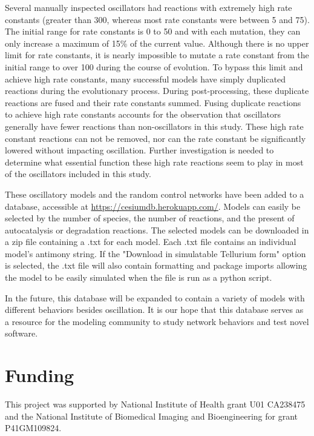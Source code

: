\documentclass[12pt]{report}
\begin{document}
Several manually inspected oscillators had reactions with extremely high rate constants (greater than 300, whereas most rate constants were between 5 and 75). The initial range for rate constants is 0 to 50 and with each mutation, they can only increase a maximum of 15\% of the current value. Although there is no upper limit for rate constants, it is nearly impossible to mutate a rate constant from the initial range to over 100 during the course of evolution. To bypass this limit and achieve high rate constants, many successful models have simply duplicated reactions during the evolutionary process. During post-processing, these duplicate reactions are fused and their rate constants summed. Fusing duplicate reactions to achieve high rate constants accounts for the observation that oscillators generally have fewer reactions than non-oscillators in this study. These high rate constant reactions can not be removed, nor can the rate constant be significantly lowered without impacting oscillation. Further investigation is needed to determine what essential function these high rate reactions seem to play in most of the oscillators included in this study. 


These oscillatory models and the random control networks have been added to a database, accessible at \url{https://cesiumdb.herokuapp.com/}. Models can easily be selected by the number of species, the number of reactions, and the present of autocatalysis or degradation reactions. The selected models can be downloaded in a zip file containing a .txt for each model. Each .txt file contains an individual model's antimony string. If the "Download in simulatable Tellurium form" option is selected, the .txt file will also contain formatting and package imports allowing the model to be easily simulated when the file is run as a python script. 

In the future, this database will be expanded to contain a variety of models with different behaviors besides oscillation. It is our hope that this database serves as a resource for the modeling community to study network behaviors and test novel software.


\section*{Funding}
This project was supported by National Institute of Health grant U01 CA238475 and the National Institute of Biomedical Imaging and Bioengineering for grant P41GM109824.
\end{document}
